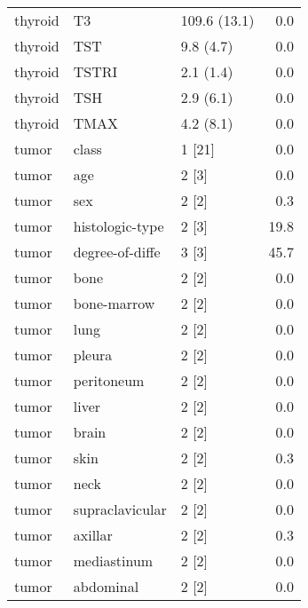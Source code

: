 \begin{tabular}{lllr}
thyroid & T3 & 109.6 (13.1) & 0.0 \\
thyroid & TST & 9.8 (4.7) & 0.0 \\
thyroid & TSTRI & 2.1 (1.4) & 0.0 \\
thyroid & TSH & 2.9 (6.1) & 0.0 \\
thyroid & TMAX & 4.2 (8.1) & 0.0 \\
tumor & class & 1 [21] & 0.0 \\
tumor & age & 2 [3] & 0.0 \\
tumor & sex & 2 [2] & 0.3 \\
tumor & histologic-type & 2 [3] & 19.8 \\
tumor & degree-of-diffe & 3 [3] & 45.7 \\
tumor & bone & 2 [2] & 0.0 \\
tumor & bone-marrow & 2 [2] & 0.0 \\
tumor & lung & 2 [2] & 0.0 \\
tumor & pleura & 2 [2] & 0.0 \\
tumor & peritoneum & 2 [2] & 0.0 \\
tumor & liver & 2 [2] & 0.0 \\
tumor & brain & 2 [2] & 0.0 \\
tumor & skin & 2 [2] & 0.3 \\
tumor & neck & 2 [2] & 0.0 \\
tumor & supraclavicular & 2 [2] & 0.0 \\
tumor & axillar & 2 [2] & 0.3 \\
tumor & mediastinum & 2 [2] & 0.0 \\
tumor & abdominal & 2 [2] & 0.0 \\
\bottomrule
\end{tabular}
